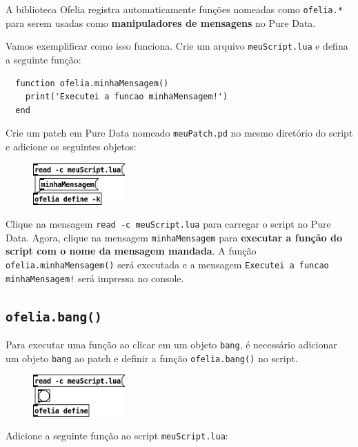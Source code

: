 \documentclass{article}
\begin{document}
A biblioteca Ofelia registra automaticamente funções nomeadas como \texttt{ofelia.*} para serem usadas como \textbf{manipuladores de mensagens} no Pure Data.

Vamos exemplificar como isso funciona.
Crie um arquivo \texttt{meuScript.lua} e defina a seguinte função:

\begin{center}
  \begin{lstlisting}
  function ofelia.minhaMensagem()
    print('Executei a funcao minhaMensagem!')
  end
  \end{lstlisting}
\end{center}

Crie um patch em Pure Data nomeado \texttt{meuPatch.pd} no mesmo diretório do script e adicione os seguintes objetos:

\begin{figure}[h]
  \centering
  \includegraphics[width=100pt]{passo1.png}
\end{figure}

Clique na mensagem \texttt{read -c meuScript.lua} para carregar o script no Pure Data. Agora, clique na mensagem \texttt{minhaMensagem} para \textbf{executar a função do script com o nome da mensagem mandada}. A função \texttt{ofelia.minhaMensagem()} será executada e a mensagem \texttt{Executei a funcao minhaMensagem!} será impressa no console.

\subsection{\texttt{ofelia.bang()}}

Para executar uma função ao clicar em um objeto \texttt{bang}, é necessário adicionar um objeto \texttt{bang} ao patch e definir a função \texttt{ofelia.bang()} no script.

\begin{figure}[H]
  \centering
  \includegraphics[width=100pt]{bang.png}
\end{figure}

Adicione a seguinte função ao script \texttt{meuScript.lua}:
\end{document}
